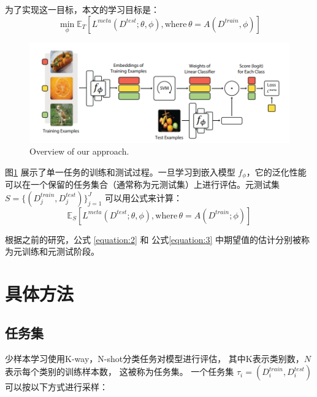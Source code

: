 为了实现这一目标，本文的学习目标是：
\begin{equation}
    \label{equation:2}
    \min_{\phi} \mathbb{E}_{T} [L^{meta}(D^{test}; \theta, \phi), \mathrm{where} \, \theta = A(D^{train}, \phi)]
\end{equation}

\begin{figure}[htbp]
    \centering
    \includegraphics[width=.7\linewidth]{figure/p1.png}
    \caption{Overview of our approach.}
    \label{fig:1}
\end{figure}

图\ref{fig:1} 展示了单一任务的训练和测试过程。一旦学习到嵌入模型 $f_{\phi}$，它的泛化性能可以在一个保留的任务集合（通常称为元测试集）上进行评估。元测试集 
$S = \{(D_j^{train}, D_j^{test})\}^J_{j=1}$ 可以用公式来计算：
\begin{equation}
    \label{equation:3}
    \mathbb{E}_S[L^{meta}(D^{test}; \theta, \phi), \mathrm{where} \, \theta = A(D^{train}; \phi)]
\end{equation}

根据之前的研究，公式 \ref{equation:2} 和 公式\ref{equation:3}
中期望值的估计分别被称为元训练和元测试阶段。




\section{具体方法}
\subsection{任务集}
少样本学习使用K-way，N-shot分类任务对模型进行评估，
其中K表示类别数，$N$表示每个类别的训练样本数，
这被称为任务集。
一个任务集 $\tau_i=(D_i^{train}, D_i^{test})$ 可以按以下方式进行采样：

